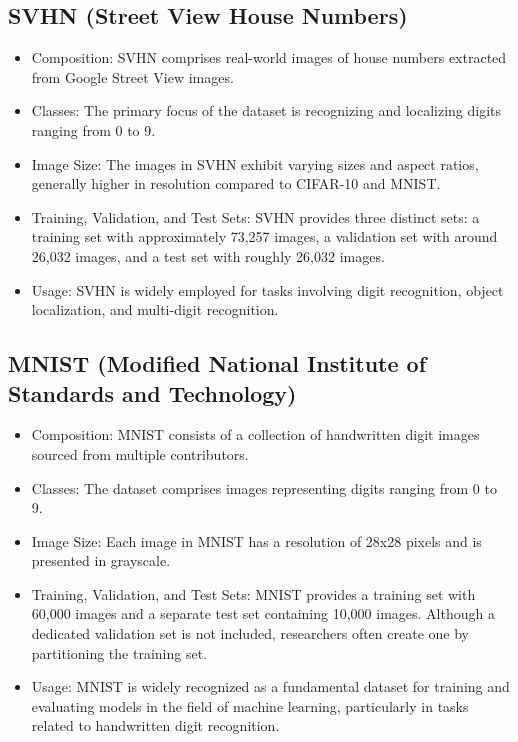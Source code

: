 \documentclass{midl} %
\begin{document}
\subsection{SVHN (Street View House Numbers)}
\begin{itemize}
  \item Composition: SVHN comprises real-world images of house numbers extracted from Google Street View images.
  \item Classes: The primary focus of the dataset is recognizing and localizing digits ranging from 0 to 9.
  \item Image Size: The images in SVHN exhibit varying sizes and aspect ratios, generally higher in resolution compared to CIFAR-10 and MNIST.
  \item Training, Validation, and Test Sets: SVHN provides three distinct sets: a training set with approximately 73,257 images, a validation set with around 26,032 images, and a test set with roughly 26,032 images.
  \item Usage: SVHN is widely employed for tasks involving digit recognition, object localization, and multi-digit recognition.
\end{itemize}

\subsection{MNIST (Modified National Institute of Standards and Technology)}
\begin{itemize}
  \item Composition: MNIST consists of a collection of handwritten digit images sourced from multiple contributors.
  \item Classes: The dataset comprises images representing digits ranging from 0 to 9.
  \item Image Size: Each image in MNIST has a resolution of 28x28 pixels and is presented in grayscale.
  \item Training, Validation, and Test Sets: MNIST provides a training set with 60,000 images and a separate test set containing 10,000 images. Although a dedicated validation set is not included, researchers often create one by partitioning the training set.
  \item Usage: MNIST is widely recognized as a fundamental dataset for training and evaluating models in the field of machine learning, particularly in tasks related to handwritten digit recognition.
\end{itemize}
\end{document}
